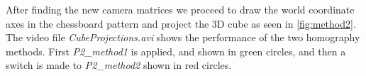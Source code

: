 After finding the new camera matrices we proceed to draw the world coordinate axes in the chessboard pattern and project the 3D cube as seen in \ref{fig:method2}.\newline
The video file \textsl{CubeProjections.avi} shows the performance of the two homography methods. First \textsl{P2\_method1} is applied, and shown in green circles, and then a switch is made to \textsl{P2\_method2} shown in red circles.
\newpage